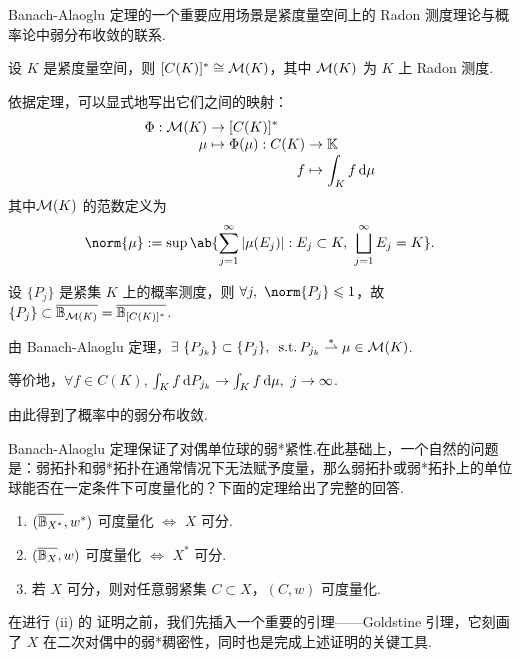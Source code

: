 Banach-Alaoglu 定理的一个重要应用场景是紧度量空间上的 Radon 测度理论与概率论中弱分布收敛的联系.

设 $K$ 是紧度量空间，则 $[C(K)]^* \cong \mathcal{M}(K)$，其中 $\mathcal{M}(K)$ 为 $K$ 上 Radon 测度.\par
依据定理，可以显式地写出它们之间的映射：
\begin{align*}
\Phi: \mathcal{M}(K) &\to [C(K)]^*\\[-3pt]
\mu &\mapsto \Phi(\mu):\begin{aligned}[t]
    C(K)&\to \mathbb{K}\\[-3pt]
    f&\mapsto \int_K f \mathop{}\!\mathrm{d}\mu
\end{aligned} 
\end{align*}
其中$\mathcal{M}(K)$ 的范数定义为
\[
\norm{\mu} := \sup\ab\{ \sum_{j=1}^\infty |\mu(E_j)|: E_j\subset K,\ \bigsqcup_{j=1}^\infty E_j = K \}.
\]

设 $\{P_j\}$ 是紧集 $K$ 上的概率测度，则 $\forall j,\ \norm{P_j}\leq 1$，故 $\{P_j\}\subset \overline{\mathbb{B}_{\mathcal{M}(K)}} = \overline{\mathbb{B}_{[C(K)]^*}}$.\par
由 Banach-Alaoglu 定理，$\exists\ \{P_{j_k}\}\subset \{P_j\},\ \st P_{j_k} \weakstar \mu\in \mcal{M}(K)$.\par
等价地，$\forall f\in C(K)$, $\int_K f \d P_{j_k} \to \int_K f\d\mu,\ j\to\infty$.\par
由此得到了概率中的弱分布收敛.


Banach-Alaoglu 定理保证了对偶单位球的弱*紧性.在此基础上，一个自然的问题是：弱拓扑和弱*拓扑在通常情况下无法赋予度量，那么弱拓扑或弱*拓扑上的单位球能否在一定条件下可度量化的？下面的定理给出了完整的回答.

\begin{theorem}[可度量化]
    \begin{enumerate}
        \item[(i)] $(\overline{\mathbb{B}_{X^*}}, w^*)$ 可度量化 $\iff$ $X$ 可分.
        \item[(ii)] $(\overline{\mathbb{B}_X}, w)$ 可度量化 $\iff$ $X^*$ 可分.
        \item[(iii)] 若 $X$ 可分，则对任意弱紧集 $C\subset X$，$(C,w)$ 可度量化.
    \end{enumerate}
\end{theorem}

在进行 (ii) 的 证明之前，我们先插入一个重要的引理——Goldstine 引理，它刻画了 $X$ 在二次对偶中的弱*稠密性，同时也是完成上述证明的关键工具.

